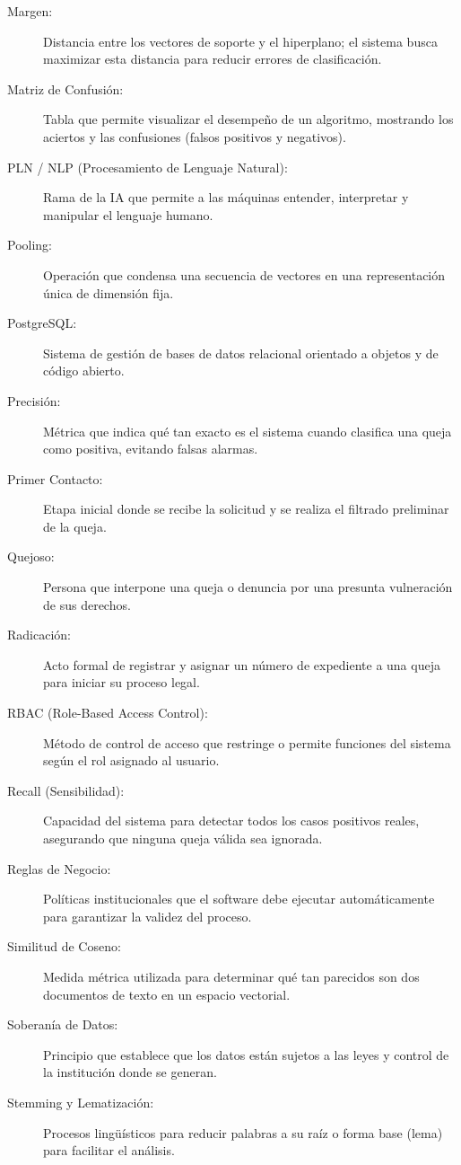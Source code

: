\begin{description}
    \item[Margen:] Distancia entre los vectores de soporte y el hiperplano; el sistema busca maximizar esta distancia para reducir errores de clasificación.
    \item[Matriz de Confusión:] Tabla que permite visualizar el desempeño de un algoritmo, mostrando los aciertos y las confusiones (falsos positivos y negativos).
    \item[PLN / NLP (Procesamiento de Lenguaje Natural):] Rama de la IA que permite a las máquinas entender, interpretar y manipular el lenguaje humano.
     \item[Pooling:] Operación que condensa una secuencia de vectores en una
    representación única de dimensión fija.
    \item[PostgreSQL:] Sistema de gestión de bases de datos relacional orientado a objetos y de código abierto.
    \item[Precisión:] Métrica que indica qué tan exacto es el sistema cuando clasifica una queja como positiva, evitando falsas alarmas.
    \item[Primer Contacto:] Etapa inicial donde se recibe la solicitud y se realiza el filtrado preliminar de la queja.
    \item[Quejoso:] Persona que interpone una queja o denuncia por una presunta vulneración de sus derechos.
    \item[Radicación:] Acto formal de registrar y asignar un número de expediente a una queja para iniciar su proceso legal.
    \item[RBAC (Role-Based Access Control):] Método de control de acceso que restringe o permite funciones del sistema según el rol asignado al usuario.
    \item[Recall (Sensibilidad):] Capacidad del sistema para detectar todos los casos positivos reales, asegurando que ninguna queja válida sea ignorada.
    \item[Reglas de Negocio:] Políticas institucionales que el software debe ejecutar automáticamente para garantizar la validez del proceso.
    \item[Similitud de Coseno:] Medida métrica utilizada para determinar qué tan parecidos son dos documentos de texto en un espacio vectorial.
    \item[Soberanía de Datos:] Principio que establece que los datos están sujetos a las leyes y control de la institución donde se generan.
    \item[Stemming y Lematización:] Procesos lingüísticos para reducir palabras a su raíz o forma base (lema) para facilitar el análisis.

\end{description}
